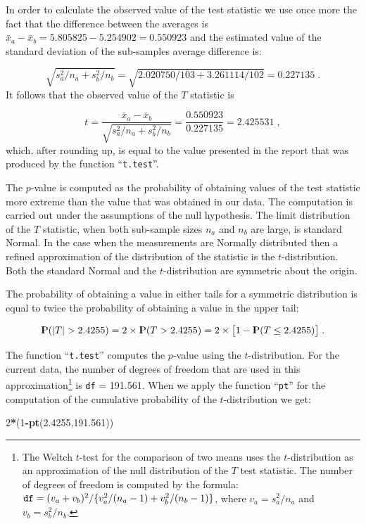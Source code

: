 \documentclass[]{krantz}
\makeatletter
\newenvironment{Shaded}{\begin{snugshade}}{\end{snugshade}}
\newcommand{\DecValTok}[1]{\textcolor[rgb]{0.00,0.00,0.81}{#1}}
\newcommand{\FloatTok}[1]{\textcolor[rgb]{0.00,0.00,0.81}{#1}}
\newcommand{\KeywordTok}[1]{\textcolor[rgb]{0.13,0.29,0.53}{\textbf{#1}}}
\newcommand{\NormalTok}[1]{#1}
\newcommand{\OperatorTok}[1]{\textcolor[rgb]{0.81,0.36,0.00}{\textbf{#1}}}
\newcommand{\Prob}{{\rm I\kern-.3em P}}
\newenvironment{kframe}{%
\medskip{}
\setlength{\fboxsep}{.8em}
 \def\at@end@of@kframe{}%
 \ifinner\ifhmode%
  \def\at@end@of@kframe{\end{minipage}}%
  \begin{minipage}{\columnwidth}%
 \fi\fi%
 \def\FrameCommand##1{\hskip\@totalleftmargin \hskip-\fboxsep
 \colorbox{shadecolor}{##1}\hskip-\fboxsep
     \hskip-\linewidth \hskip-\@totalleftmargin \hskip\columnwidth}%
 \MakeFramed {\advance\hsize-\width
   \@totalleftmargin\z@ \linewidth\hsize
   \@setminipage}}%
 {\par\unskip\endMakeFramed%
 \at@end@of@kframe}
\renewenvironment{Shaded}{\begin{kframe}}{\end{kframe}}
\theoremstyle{definition}
\theoremstyle{definition}
\theoremstyle{definition}
\theoremstyle{remark}
\makeatother
\begin{document}
In order to calculate the observed value of the test statistic we use
once more the fact that the difference between the averages is
\(\bar x_a - \bar x_b = 5.805825 - 5.254902 = 0.550923\) and the
estimated value of the standard deviation of the sub-samples average
difference is:

\[\sqrt{s_a^2/n_a + s_b^2/n_b} = \sqrt{2.020750/103 + 3.261114/102} = 0.227135\;.\]
It follows that the observed value of the \(T\) statistic is

\[t = \frac{\bar x_a - \bar x_b}{\sqrt{s_a^2/n_a + s_b^2/n_b}} = \frac{0.550923}{0.227135} = 2.425531\;,\]
which, after rounding up, is equal to the value presented in the report
that was produced by the function ``\texttt{t.test}''.

The \(p\)-value is computed as the probability of obtaining values of the
test statistic more extreme than the value that was obtained in our
data. The computation is carried out under the assumptions of the null
hypothesis. The limit distribution of the \(T\) statistic, when both
sub-sample sizes \(n_a\) and \(n_b\) are large, is standard Normal. In the
case when the measurements are Normally distributed then a refined
approximation of the distribution of the statistic is the
\(t\)-distribution. Both the standard Normal and the \(t\)-distribution are
symmetric about the origin.

The probability of obtaining a value in either tails for a symmetric
distribution is equal to twice the probability of obtaining a value in
the upper tail:

\[\Prob( |T| > 2.4255) = 2 \times \Prob( T > 2.4255) =  2 \times \big [1 - \Prob( T \leq  2.4255)\big ]\;.\]

The function ``\texttt{t.test}'' computes the \(p\)-value using the
\(t\)-distribution. For the current data, the number of degrees of freedom
that are used in this approximation\footnote{The Weltch \(t\)-test for the comparison of two means uses the
  \(t\)-distribution as an approximation of the null distribution of the
  \(T\) test statistic. The number of degrees of freedom is computed by
  the formula:
  \(\mbox{\texttt{df}} = (v_a + v_b)^2/\{v_a^2/(n_a-1) + v_b^2/(n_b-1)\}\),
  where \(v_a = s_a^2/n_a\) and \(v_b = s_b^2/n_b\).} is \texttt{df} = 191.561. When we apply
the function ``\texttt{pt}'' for the computation of the cumulative probability of
the \(t\)-distribution we get:

\begin{Shaded}
\begin{Highlighting}[]
\DecValTok{2}\OperatorTok{*}\NormalTok{(}\DecValTok{1}\OperatorTok{-}\KeywordTok{pt}\NormalTok{(}\FloatTok{2.4255}\NormalTok{,}\FloatTok{191.561}\NormalTok{))}
\end{Highlighting}
\end{Shaded}
\end{document}
